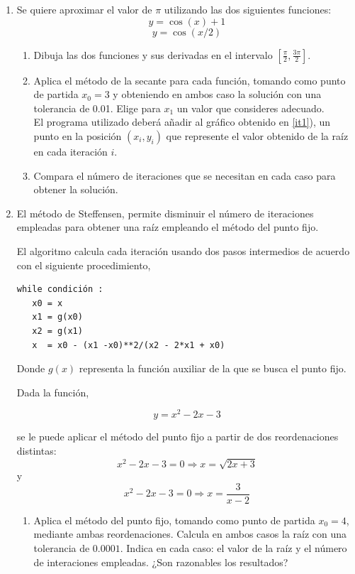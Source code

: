 \begin{enumerate}
\item Se quiere aproximar el valor de $\pi$ utilizando las dos siguientes funciones:
\begin{equation*}
y=\cos(x)+1
\end{equation*}
\begin{equation*}
y=\cos(x/2)
\end{equation*}
\begin{enumerate}
\item \label{it1}Dibuja las dos funciones y sus derivadas en el intervalo $[\frac{\pi}{2},\frac{3\pi}{2}]$.
\item Aplica el método de la secante para cada función, tomando como punto de partida  $x_0=3$ y obteniendo en ambos caso la solución con una tolerancia de 0.01. Elige para $x_1$ un valor que consideres adecuado.\\
El programa utilizado deberá añadir al gráfico obtenido en  \ref{it1}), un punto en la posición $(x_i,y_i)$ que represente el valor obtenido de la raíz en cada iteración $i$.
\item Compara el número de iteraciones que se necesitan en cada caso para obtener la solución.
\end{enumerate}

\item El método de Steffensen, permite disminuir el número de iteraciones empleadas para obtener una raíz empleando el método del punto fijo.

El algoritmo calcula cada iteración usando dos pasos intermedios de acuerdo con el siguiente procedimiento,

\begin{verbatim}
while condición : 
   x0 = x
   x1 = g(x0)
   x2 = g(x1)
   x  = x0 - (x1 -x0)**2/(x2 - 2*x1 + x0)
 \end{verbatim}

Donde $g(x)$ representa la función auxiliar de la que se busca el punto fijo.


Dada la función,

\begin{equation*}
y= x^2-2x-3
\end{equation*} 

se le puede aplicar el método del punto fijo a  partir de dos reordenaciones distintas:
\begin{equation}
x^2-2x-3=0 \Rightarrow x=\sqrt{2x+3}
\end{equation}
y
\begin{equation}
x^2-2x-3=0 \Rightarrow x=\frac{3}{x-2}
\end{equation}
\begin{enumerate}
\item Aplica el método del punto fijo, tomando como punto de partida $x_0=4$, mediante ambas reordenaciones. Calcula en ambos casos la raíz con una tolerancia de $0.0001$. Indica en cada caso: el valor de la raíz y el número de interaciones empleadas.  ¿Son razonables los resultados?


\end{enumerate}
\end{enumerate}
